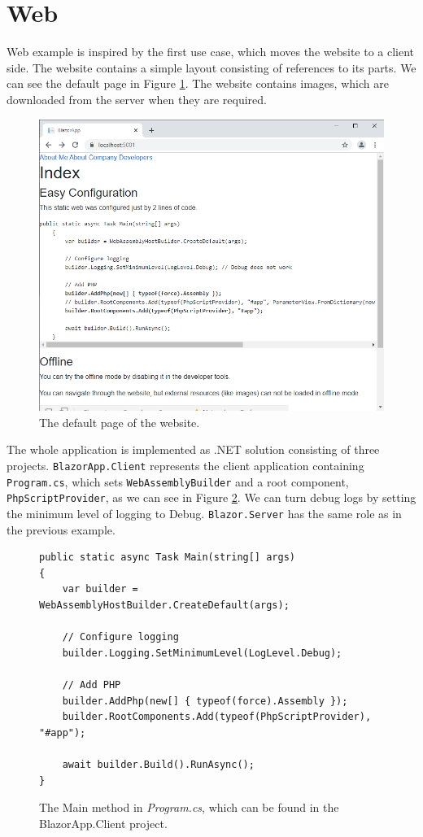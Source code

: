 \section{Web}

Web example is inspired by the first use case, which moves the website to a client side.
The website contains a simple layout consisting of references to its parts.
We can see the default page in Figure \ref{img28:website}.
The website contains images, which are downloaded from the server when they are required.
\par
\begin{figure}[!b]\centering
\includegraphics[scale=0.5]{./img/Web}
\caption{The default page of the website.}
\label{img28:website}
\end{figure} 
\par
The whole application is implemented as .NET solution consisting of three projects.
\texttt{BlazorApp.Client} represents the client application containing \texttt{Program.cs}, which sets \texttt{WebAssemblyBuilder} and a root component, \texttt{PhpScriptProvider}, as we can see in Figure \ref{img20:program}.
We can turn debug logs by setting the minimum level of logging to Debug.
\texttt{Blazor.Server} has the same role as in the previous example.
\par
\begin{figure}
\begin{lstlisting}
public static async Task Main(string[] args)
{
	var builder = WebAssemblyHostBuilder.CreateDefault(args);

	// Configure logging
	builder.Logging.SetMinimumLevel(LogLevel.Debug);

	// Add PHP
	builder.AddPhp(new[] { typeof(force).Assembly });
	builder.RootComponents.Add(typeof(PhpScriptProvider), "#app");
            
	await builder.Build().RunAsync();
}
\end{lstlisting}
\caption{The Main method in \textit{Program.cs}, which can be found in the BlazorApp.Client project.}
\label{img20:program}
\end{figure}
